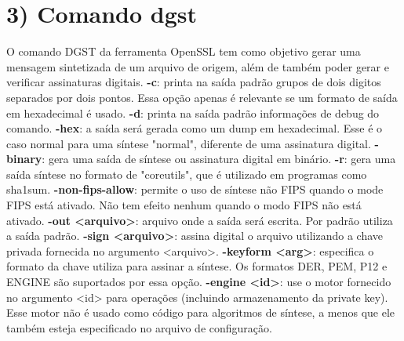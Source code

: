 \documentclass[a4paper,11pt]{article}
\theoremstyle{mytheor}
\begin{document}
\section*{3) Comando dgst}

O comando DGST da ferramenta OpenSSL tem como objetivo gerar uma mensagem sintetizada de um arquivo de origem, além de também poder gerar e verificar assinaturas digitais.
\newline\newline
\noindent \textbf{-c}:  printa na saída padrão grupos de dois digitos separados por dois pontos. Essa opção apenas é relevante se um formato de saída em hexadecimal é usado.
\newline\newline
\noindent \textbf{-d}:  printa na saída padrão informações de debug do comando. 
\newline\newline
\noindent \textbf{-hex}: a saída será gerada como um dump em hexadecimal. Esse é o caso normal para uma síntese "normal", diferente de uma assinatura digital.
\newline\newline
\noindent \textbf{-binary}: gera uma saída de síntese ou assinatura digital em binário.
\newline\newline
\noindent \textbf{-r}: gera uma saída síntese no formato de "coreutils", que é utilizado em programas como sha1sum.
\newline\newline
\noindent \textbf{-non-fips-allow}: permite o uso de síntese não FIPS quando o mode FIPS está ativado. Não tem efeito nenhum quando o modo FIPS não está ativado. 
\newline\newline
\noindent \textbf{-out <arquivo>}: arquivo onde a saída será escrita. Por padrão utiliza a saída padrão. 
\newline\newline
\noindent \textbf{-sign <arquivo>}: assina digital o arquivo utilizando a chave privada fornecida no argumento <arquivo>.
\newline\newline
\noindent \textbf{-keyform <arg>}: especifica o formato da chave utiliza para assinar a síntese. Os formatos DER, PEM, P12 e ENGINE são suportados por essa opção.
\newline\newline
\noindent \textbf{-engine <id>}: use o motor fornecido no argumento <id> para operações (incluindo armazenamento da private key). Esse motor não é usado como código para algoritmos de síntese, a menos que ele também esteja especificado no arquivo de configuração.
\end{document}

